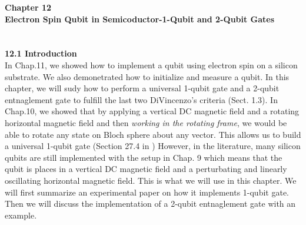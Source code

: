 \documentclass{article}
\begin{document}
\medskip
\textbf{\Large Chapter 12\\
Electron Spin Qubit in Semicoductor-1-Qubit and 2-Qubit Gates}\\\\\\
\medskip
\textbf{\large 12.1 Introduction}\\
In Chap.11, we showed how to implement a qubit using electron spin on a silicon
substrate. We also demonetrated how to initialize and measure a qubit. In this chapter,
we will sudy how to perform a universal 1-qubit gate and a 2-qubit entnaglement gate to fulfill
the last two DiVincenzo's criteria (Sect. 1.3). In Chap.10, we showed
that by applying a vertical DC magnetic field and a rotating  horizontal magnetic field and
then \textit{working in the rotating frame}, we would be able to rotate any state on Bloch sphere
about any vector. This allows us to build a universal 1-qubit gate (Section 27.4 in \cite{WongHuiYong})
However, in the literature, many silicon qubits are still implemented with the setup in Chap. 9 which means
that the qubit is places in a vertical DC magnetic field and a perturbating and linearly oscillating horizontal
magnetic field. This is what we will use in this chapter. We will first summarize an experimental paper on how
it implements 1-qubit gate. Then we will discuss the implementation of a 2-qubit entnaglement gate with an example.


\printbibliography
\end{document}
